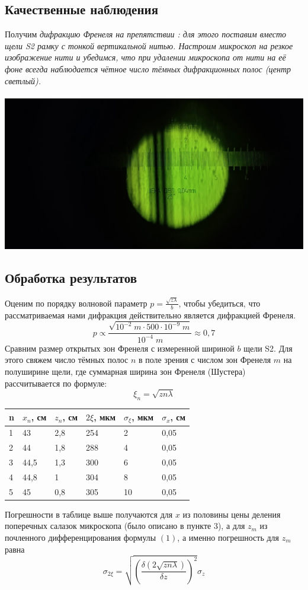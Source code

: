 \documentclass[a4paper]{article}
\begin{document}
\subsection*{Качественные наблюдения}
Получим \em дифракцию Френеля на препятствии \em : для этого поставим вместо щели S2 рамку с тонкой вертикальной нитью. Настроим микроскоп на резкое изображение нити и убедимся, что при удалении микроскопа от нити на её фоне всегда наблюдается чётное число тёмных дифракционных полос (центр светлый).\\
\\
\includegraphics[width=18cm]{a1}\\
\subsection*{Обработка результатов}
Оценим по порядку волновой параметр $p = \frac{\sqrt{z \lambda}}{b}$, чтобы убедиться, что рассматриваемая нами дифракция действительно является дифракцией Френеля.\\
$$ p \propto \frac{\sqrt{10^{-2} \; m \cdot 500 \cdot 10^{-9}\; m}}{10^{-4} \; m} \approx  0,7$$
Сравним размер открытых зон Френеля с измеренной шириной $b$ щели S2. Для этого свяжем число тёмных полос $n$ в поле зрения с числом зон Френеля $m$ на полуширине щели, где суммарная ширина зон Френеля (Шустера) рассчитывается по формуле: \\
$$\xi_n = \sqrt{zn\lambda}$$
\begin{center}
\begin{tabular}{|l|l|l|l|l|l|}
\hline
n & $x_n$, см & $z_n$, см & $2\xi$, мкм & $\sigma_{\xi}$, мкм & $\sigma_{x}$, см\\
\hline
1 & 43 & 2,8 & 254 &2&0,05 \\
\hline
2 & 44 & 1,8 & 288 & 4&0,05 \\
\hline
3 & 44,5 & 1,3 & 300 & 6&0,05 \\
\hline
4 & 44,8 & 1 & 304 & 8& 0,05\\
\hline
5 & 45 & 0,8 & 305 & 10& 0,05\\
\hline
\end{tabular}
\end{center}
Погрешности в таблице выше получаются для $x$ из половины цены деления поперечных салазок микроскопа (было описано в пункте 3), а для $z_m$ из почленного дифференцирования формулы $(1)$, а именно погрешность для $z_m$ равна 
$$ \sigma_{2\xi} = \sqrt{(\frac{\delta (2\sqrt{zn\lambda})}{\delta z})^2}\sigma_z$$
\end{document}
